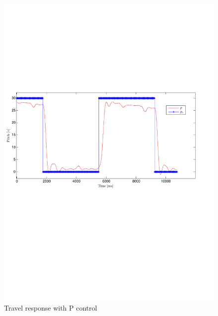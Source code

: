 \begin{figure}[!!ht!!!!!!!!tb!!]
	\centering
		\includegraphics[width=1\textwidth,trim={4cm 9cm 4cm 9cm},clip]{figures/P3p2_p.pdf}
	\caption{Travel response with P control}
\label{fig:P3p2_p}
\end{figure}
\clearpage
